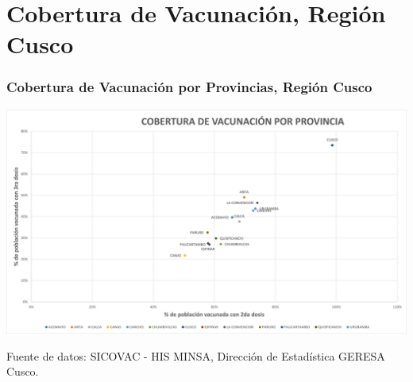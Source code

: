 \documentclass[xcolor=table]{beamer}
\begin{document}
%			
%	
%
%	
%			
%	

\section{Cobertura de Vacunación, Región Cusco}

\begin{frame}[label=cobertura_vacuna]
	\frametitle{Cobertura de Vacunación por Provincias, Región Cusco}
	\vspace{-.7cm}
	\begin{center}
		\includegraphics[width=1.0\linewidth, trim={.2cm .2cm .2cm .2cm},clip]{../sala_nacional/Cobertura_Vacunacion_Provincias.jpg}
	\end{center}
	{\tiny Fuente de datos: SICOVAC - HIS MINSA, Dirección de Estadística GERESA Cusco.} 
\end{frame}
\end{document}
